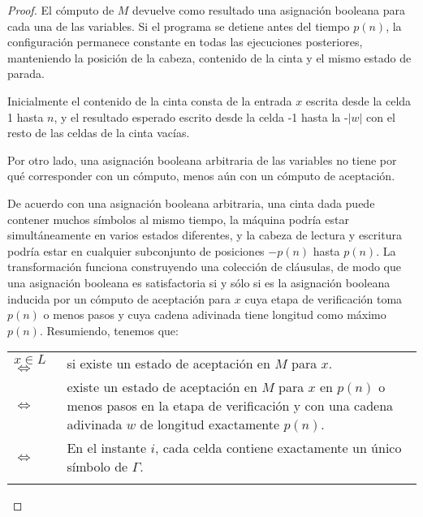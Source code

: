 \documentclass[a4paper, spanish, utf8]{memoir}
\begin{document}
\begin{proof}
  El cómputo de $M$ devuelve como resultado una asignación booleana para cada
  una de las variables. Si el programa se detiene antes del tiempo $p(n)$, la
  configuración permanece constante en todas las ejecuciones posteriores,
  manteniendo la posición de la cabeza, contenido de la cinta y el mismo estado
  de parada.

  Inicialmente el contenido de la cinta consta de la entrada $x$ escrita desde
  la celda 1 hasta $n$, y el resultado esperado escrito desde la celda -1 hasta
  la -$|w|$ con el resto de las celdas de la cinta vacías.

  Por otro lado, una asignación booleana arbitraria de las variables no tiene
  por qué corresponder con un cómputo, menos aún con un cómputo de aceptación.

  De acuerdo con una asignación booleana arbitraria, una cinta dada puede
  contener muchos símbolos al mismo tiempo, la máquina podría estar
  simultáneamente en varios estados diferentes, y la cabeza de lectura y
  escritura podría estar en cualquier subconjunto de posiciones $-p(n)$ hasta
  $p(n)$. La transformación funciona construyendo una colección de cláusulas, de
  modo que una asignación booleana es satisfactoria si y sólo si es la
  asignación booleana inducida por un cómputo de aceptación para $x$ cuya etapa
  de verificación toma $p(n)$ o menos pasos y cuya cadena adivinada tiene
  longitud como máximo $p(n)$. Resumiendo, tenemos que:

  \begin{table}[!ht]
    \label{tab:cooktab2}
    \begin{center}
      {\small
        \renewcommand{\arraystretch}{1.2}
        \begin{tabular}{@{}C{.15\textwidth}L{.45\textwidth}@{}}
          \toprule
          \midrule
          $x \in L$ $\iff$     &
                                 si existe un estado de aceptación en $M$ para $x$. \\
          $\iff$      &
                        existe un estado de aceptación en $M$ para $x$ en $p(n)$ o menos pasos en la etapa de verificación y con una cadena adivinada $w$ de longitud exactamente $p(n)$. \\
          $\iff$       &
                         En el instante $i$, cada celda contiene exactamente un único símbolo de $\Gamma$. \\ \\

          \bottomrule
        \end{tabular}
      }
    \end{center}
  \end{table}



\end{proof}
\end{document}
